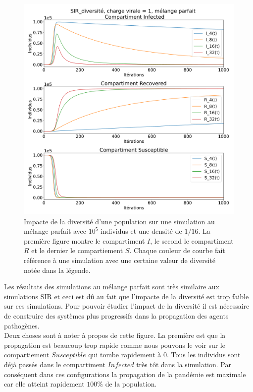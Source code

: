 \newpage

\begin{figure}[h]
	\centering
	\captionsetup{justification=centering}
	\includegraphics[width=.8\textwidth]{Images/SIR_diversite_mix.pdf}
	\caption[Impacte de la diversité]{Impacte de la diversité d'une population sur une simulation au mélange parfait avec $10^5$ individus et une densité de $1/16$. La première figure montre le compartiment $I$, le second le compartiment $R$ et le dernier le compartiement $S$. Chaque couleur de courbe fait référence à une simulation avec une certaine valeur de diversité notée dans la légende.}
\end{figure}

Les résultats des simulations au mélange parfait sont très similaire aux simulations SIR et ceci est dû au fait que l'impacte de la diversité est trop faible sur ces simulations. Pour pouvoir étudier l'impact de la diversité il est nécessaire de construire des systèmes plus progressifs dans la propagation des agents pathogènes.\\

Deux choses sont à noter à propos de cette figure. La première est que la propagation est beaucoup trop rapide comme nous pouvons le voir sur le compartiement $Susceptible$ qui tombe rapidement à $0$. Tous les individus sont déjà passés dans le compartiment $Infected$ très tôt dans la simulation. Par conséquent dans ces configurations la propagation de la pandémie est maximale car elle atteint rapidement $100\%$ de la population.\\

